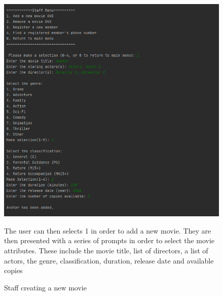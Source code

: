 \documentclass[a4paper,12pt]{article}
\begin{document}
\begin{figure}[!htb]
\centering
\includegraphics[width=1\textwidth]{2}
\caption{Staff creating a new movie}
\medskip
\small
The user can then selects 1 in order to add a new movie. They are then presented with a series of prompts in order to select the movie attributes. These include the movie title, list of directors, a list of actors, the genre, classification, duration, release date and available copies 
\end{figure}
\end{document}

